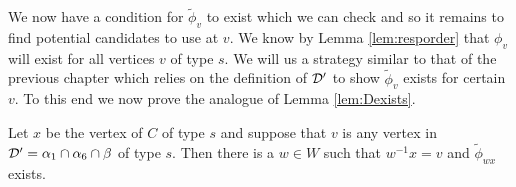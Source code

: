 \documentclass[class=book, crop=false]{standalone}
\begin{document}
%
%
We now have a condition for $\tilde{\phi}_v$ to exist which we can check and so it remains to find potential candidates to use at $v.$ We know by Lemma \ref{lem:resporder} that $\phi_{v}$ will exist for all vertices $v$ of type $s.$ We will us a strategy similar to that of the previous chapter which relies on the definition of $\mathcal{D}'$ to show $\tilde{\phi}_v$ exists for certain $v.$ To this end we now prove the analogue of Lemma \ref{lem:Dexists}.

\begin{lemma} 
	\label{lem:336f2Dex}
 Let $x$ be the vertex of $C$ of type $s$ and suppose that $v$ is any vertex in $\mathcal{D}'=\alpha_1\cap \alpha_6\cap \beta$ of type $s.$ Then there is a $w\in W$ such that $w^{-1}x=v$ and $\tilde{\phi}_{wx}$ exists.
\end{lemma}
\end{document}
